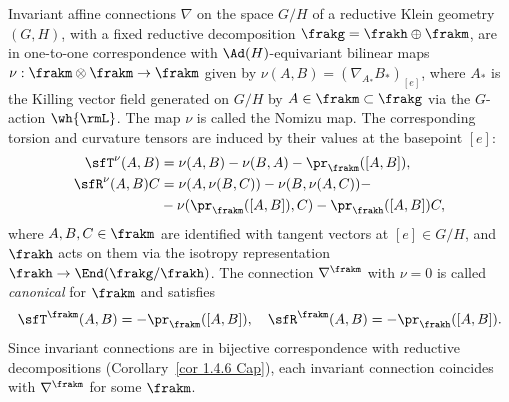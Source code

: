 \begin{cor}[Wang (1958)]
    Invariant affine connections $\nabla$ on the space $G\slash H$ of a reductive Klein geometry $(G,H)$, with a fixed reductive decomposition $\frakg=\frakh\oplus\frakm$, are in one-to-one correspondence with $\Ad(H)$-equivariant bilinear maps $\nu:\frakm\otimes\frakm\to \frakm$ given by $\nu(A,B)=(\nabla_{A_\ast}B_\ast)_{[e]}$, where $A_\ast$ is the Killing vector field generated on $G\slash H$ by $A\in\frakm\subset\frakg$ via the $G$-action $\wh{\rmL}$. The map $\nu$ is called the Nomizu map. The corresponding torsion and curvature tensors are induced by their values at the basepoint $[e]$:
    \begin{align}
        \sfT^\nu(A,B)&=\nu(A,B)-\nu(B,A)-\pr_{\frakm}([A,B]),\\
        \sfR^\nu(A,B)C&=\nu(A,\nu(B,C))-\nu(B,\nu(A,C))-\notag\\
        &-\nu(\pr_\frakm([A,B]),C)-\pr_\frakh([A,B])C,\label{eq nomizu curvature}
    \end{align}
    where $A,B,C\in\frakm$ are identified with tangent vectors at $[e]\in G\slash H$, and $\frakh$ acts on them via the isotropy representation $\frakh\to\End(\frakg\slash\frakh)$. The connection $\nabla^\frakm$ with $\nu=0$ is called \emph{canonical} for $\frakm$ and satisfies 
    \[\sfT^\frakm(A,B)=-\pr_\frakm([A,B]),\quad \sfR^\frakm(A,B)=-\pr_\frakh([A,B]).\]
    Since invariant connections are in bijective correspondence with reductive decompositions (Corollary~\ref{cor 1.4.6 Cap}), each invariant connection coincides with $\nabla^\frakm$ for some $\frakm$.
\end{cor}


